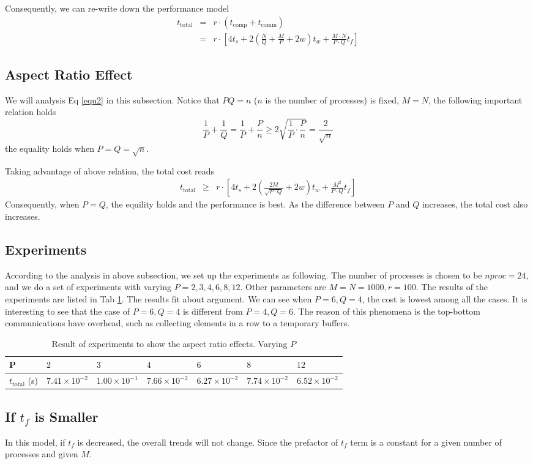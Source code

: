 Consequently, we can re-write down the performance model 
\begin{eqnarray}
	t_{\textrm{total}} &=& r \cdot \left( t_{\textrm{comp}} + t_{\textrm{comm}} \right) \\
	&=& r \cdot \left[ 4 t_s + 2 \left( \frac{N}{Q} + \frac{M}{P} + 2 w \right) t_w + \frac{M\cdot N}{P\cdot Q} t_f \right] \label{equ2}
\end{eqnarray}

\subsection{Aspect Ratio Effect}
We will analysis Eq \ref{equ2} in this subsection. Notice that $PQ = n$ ($n$ is the number of processes) is fixed, 
$M=N$, the following important relation holds
\[
	\frac{1}{P} + \frac{1}{Q} = \frac{1}{P} + \frac{P}{n} \geq 2 \sqrt{\frac{1}{P}\cdot\frac{P}{n}} = \frac{2}{\sqrt{n}}
\]
the equality holds when $P=Q=\sqrt{n}$.

Taking advantage of above relation, the total cost reads
\begin{eqnarray}
	t_{\textrm{total}} &\geq& r \cdot \left[ 4 t_s + 2 \left( \frac{2M}{\sqrt{P\cdot Q}} + 2 w \right) t_w + \frac{M^2}{P\cdot Q} t_f \right] \label{equ3}
\end{eqnarray}
Consequently, when $P=Q$, the equility holds and the performance is best. As the difference between $P$ and $Q$ increases, the total cost also increases.

\subsection{Experiments}
According to the analysis in above subsection, we set up the experiments as following. The number of processes is chosen to be $nproc = 24$, and we 
do a set of experiments with varying $P = 2, 3, 4, 6, 8, 12$. Other parameters are $M=N=1000, r=100$. The results of the experiments are listed in Tab \ref{tab4}.
The results fit about argument. We can see when $P=6, Q=4$, the cost is lowest among all the cases. It is interesting to see that the case of $P=6, Q=4$ is
different from $P=4, Q=6$. The reason of this phenomena is the top-bottom communications have overhead, such as collecting elements in a row to a temporary buffers.

\begin{table}[h]
	\centering
	\caption{Result of experiments to show the aspect ratio effects. Varying $P$}
	\label{tab4}
	\begin{tabular}{lllllll}
		\hline
		P                        & $2$ & $3$ & $4$ & $6$ & $8$ & $12$ \\ \hline
		$t_{\textrm{total}}$ (s) & $7.41\times 10^{-2}$ & $1.00\times 10^{-1}$ & $7.66\times 10^{-2}$ & $6.27\times 10^{-2}$ & $7.74\times 10^{-2}$ & $6.52\times 10^{-2}$ \\ \hline
	\end{tabular}
\end{table}

\subsection{If $t_f$ is Smaller}
In this model, if $t_f$ is decreased, the overall trends will not change. Since the prefactor of $t_f$ term is a constant for a given number of processes 
and given $M$.
